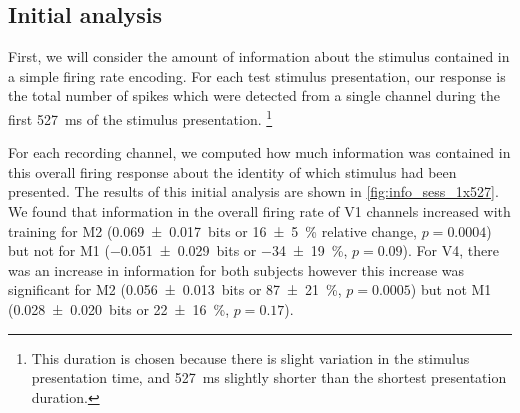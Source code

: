 \subsection{Initial analysis}
\label{sec:pl_initial}

First, we will consider the amount of information about the stimulus contained in a simple firing rate encoding.
For each test stimulus presentation, our response is the total number of spikes which were detected from a single channel during the first \SI{527}{\milli\second} of the stimulus presentation.%
\footnote{This duration is chosen because there is slight variation in the stimulus presentation time, and \SI{527}{\milli\second} slightly shorter than the shortest presentation duration.}

For each recording channel, we computed how much information was contained in this overall firing response about the identity of which stimulus had been presented.
The results of this initial analysis are shown in \autoref{fig:info_sess_1x527}.
We found that information in the overall firing rate of \ac{V1} channels increased with training for \ac{M2} (\SI{+0.069\pm0.017}{bits} or \SI{+16\pm5}{\percent} relative change, $p=0.0004$) but not for \ac{M1} (\SI{-0.051\pm0.029}{bits} or \SI{-34\pm19}{\percent}, $p=0.09$).
For \ac{V4}, there was an increase in information for both subjects however this increase was significant for \ac{M2} (\SI{+0.056\pm0.013}{bits} or \SI{+87\pm21}{\percent}, $p=0.0005$) but not \ac{M1} (\SI{+0.028\pm0.020}{bits} or \SI{+22\pm16}{\percent}, $p=0.17$).


